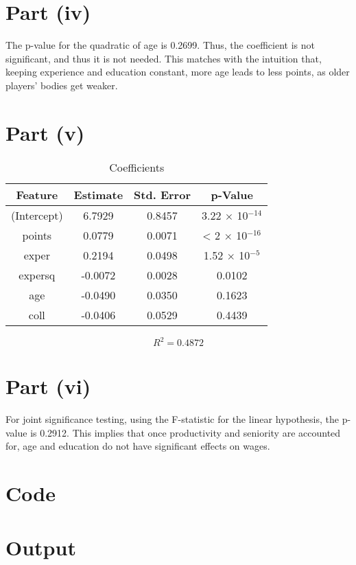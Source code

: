 \documentclass{./solution}
\begin{document}
\begin{solution}[Wooldridge C6.9]
        \section*{Part (iv)}
            The p-value for the quadratic of age is 0.2699.
            Thus, the coefficient is not significant, and thus it is not needed.
            This matches with the intuition that, keeping experience and education constant, more age leads to less points, as older players' bodies get weaker.

        \section*{Part (v)}
            \begin{table}[H]
                \caption{Coefficients}
                \begin{tabularx}{\textwidth}{C C C C}
                    \toprule
                    Feature & Estimate & Std. Error & p-Value \\
                    \midrule
                    (Intercept) &  6.7929 & 0.8457 & 3.22 $\times$ 10$^{-14}$ \\
                    points      &  0.0779 & 0.0071 &  < 2 $\times$ 10$^{-16}$ \\
                    exper       &  0.2194 & 0.0498 & 1.52 $\times$ 10$^{-5}$ \\
                    expersq     & -0.0072 & 0.0028 &   0.0102 \\
                    age         & -0.0490 & 0.0350 &   0.1623 \\
                    coll        & -0.0406 & 0.0529 &   0.4439 \\
                    \bottomrule
                \end{tabularx}
            \end{table}
            \vspace{-5mm}
            $$ R^2 = 0.4872 $$

        \section*{Part (vi)}
            For joint significance testing, using the F-statistic for the linear hypothesis, the p-value is 0.2912.
            This implies that once productivity and seniority are accounted for, age and education do not have significant effects on wages.

        \section*{Code}

        \section*{Output}
    \end{solution}
\end{document}
